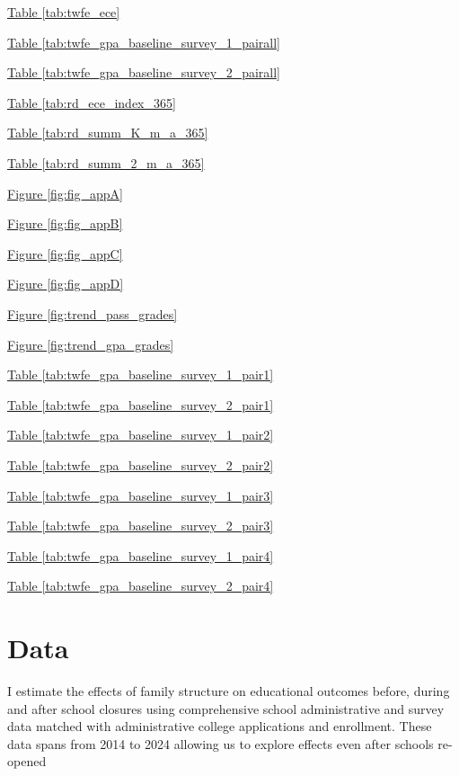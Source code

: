 \hyperref[tab:twfe_ece]{Table \ref{tab:twfe_ece}}

\hyperref[tab:twfe_gpa_baseline_survey_1_pairall]{Table \ref{tab:twfe_gpa_baseline_survey_1_pairall}}

\hyperref[tab:twfe_gpa_baseline_survey_2_pairall]{Table \ref{tab:twfe_gpa_baseline_survey_2_pairall}}

\hyperref[tab:rd_ece_index_365]{Table \ref{tab:rd_ece_index_365}}

\hyperref[tab:rd_summ_K_m_a_365]{Table \ref{tab:rd_summ_K_m_a_365}}

\hyperref[tab:rd_summ_2_m_a_365]{Table \ref{tab:rd_summ_2_m_a_365}}

\hyperref[fig:fig_appA]{Figure \ref{fig:fig_appA}}

\hyperref[fig:fig_appB]{Figure \ref{fig:fig_appB}}

\hyperref[fig:fig_appC]{Figure \ref{fig:fig_appC}}

\hyperref[fig:fig_appD]{Figure \ref{fig:fig_appD}}

\hyperref[fig:trend_pass_grades]{Figure \ref{fig:trend_pass_grades}}

\hyperref[fig:trend_gpa_grades]{Figure \ref{fig:trend_gpa_grades}}




\hyperref[tab:twfe_gpa_baseline_survey_1_pair1]{Table \ref{tab:twfe_gpa_baseline_survey_1_pair1}}

\hyperref[tab:twfe_gpa_baseline_survey_2_pair1]{Table \ref{tab:twfe_gpa_baseline_survey_2_pair1}}


\hyperref[tab:twfe_gpa_baseline_survey_1_pair2]{Table \ref{tab:twfe_gpa_baseline_survey_1_pair2}}

\hyperref[tab:twfe_gpa_baseline_survey_2_pair2]{Table \ref{tab:twfe_gpa_baseline_survey_2_pair2}}


\hyperref[tab:twfe_gpa_baseline_survey_1_pair3]{Table \ref{tab:twfe_gpa_baseline_survey_1_pair3}}

\hyperref[tab:twfe_gpa_baseline_survey_2_pair3]{Table \ref{tab:twfe_gpa_baseline_survey_2_pair3}}


\hyperref[tab:twfe_gpa_baseline_survey_1_pair4]{Table \ref{tab:twfe_gpa_baseline_survey_1_pair4}}

\hyperref[tab:twfe_gpa_baseline_survey_2_pair4]{Table \ref{tab:twfe_gpa_baseline_survey_2_pair4}}


\section{Data}\label{sec:data}
I estimate the effects of family structure on educational outcomes before, during and after school closures using comprehensive school administrative and survey data matched with administrative college applications and enrollment. These data spans from 2014 to 2024 allowing us to explore effects even after schools re-opened


